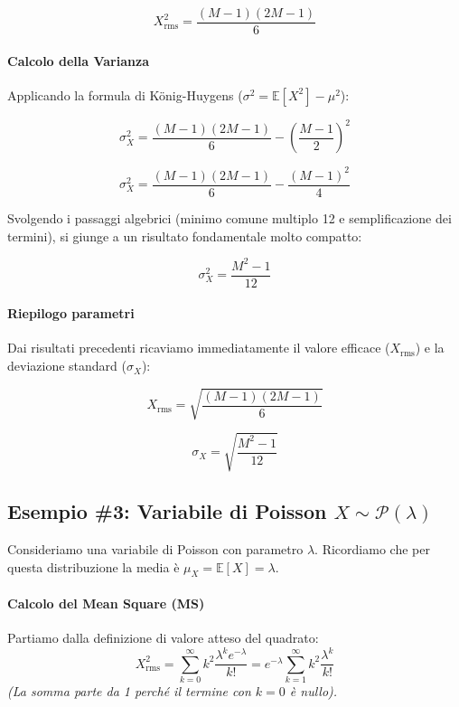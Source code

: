 \begin{equation}
X^2_{\text{rms}} = \frac{(M-1)(2M-1)}{6}
\end{equation}

\paragraph{Calcolo della Varianza}
Applicando la formula di König-Huygens ($\sigma^2 = \mathbb{E}[X^2] - \mu^2$):

\[
\sigma_X^2 = \frac{(M-1)(2M-1)}{6} - \left( \frac{M-1}{2} \right)^2
\]

\[
\sigma_X^2 = \frac{(M-1)(2M-1)}{6} - \frac{(M-1)^2}{4}
\]

Svolgendo i passaggi algebrici (minimo comune multiplo 12 e semplificazione dei termini), si giunge a un risultato fondamentale molto compatto:

\begin{equation}
\boxed{\sigma_X^2 = \frac{M^2 - 1}{12}}
\end{equation}

\paragraph{Riepilogo parametri}
Dai risultati precedenti ricaviamo immediatamente il valore efficace ($X_{\text{rms}}$) e la deviazione standard ($\sigma_X$):

\[
X_{\text{rms}} = \sqrt{\frac{(M-1)(2M-1)}{6}}
\]

\begin{equation}
\boxed{\sigma_X = \sqrt{\frac{M^2 - 1}{12}}}
\end{equation}

\subsection{Esempio \#3: Variabile di Poisson $X \sim \mathcal{P}(\lambda)$}

Consideriamo una variabile di Poisson con parametro $\lambda$. Ricordiamo che per questa distribuzione la media è $\mu_X = \mathbb{E}[X] = \lambda$.

\paragraph{Calcolo del Mean Square (MS)}
Partiamo dalla definizione di valore atteso del quadrato:
\[
X^2_{\text{rms}} = \sum_{k=0}^{\infty} k^2 \frac{\lambda^k e^{-\lambda}}{k!} = e^{-\lambda} \sum_{k=1}^{\infty} k^2 \frac{\lambda^k}{k!}
\]
\textit{(La somma parte da 1 perché il termine con $k=0$ è nullo).}

